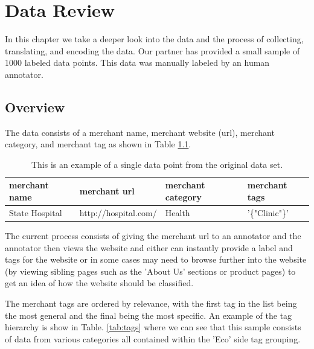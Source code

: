 \chapter{Data Review}

In this chapter we take a deeper look into the data and the process of collecting, translating, and encoding the data. Our partner has provided a small sample of 1000 labeled data points. This data was manually labeled by an human annotator. 

\section{Overview}

The data consists of a merchant name, merchant website (url), merchant category, and merchant tag as shown in Table \ref{tab:data_point}. 

\begin{table}[h]
\begin{tabular}{|l|l|l|l|}
\hline
merchant name            & merchant url            & merchant category & merchant tags           \\ \hline
State Hospital & http://hospital.com/ & Health   & '\{"Clinic"\}' \\ \hline
\end{tabular}
\caption{This is an example of a single data point from the original data set.}
\label{tab:data_point}
\end{table}


The current process consists of giving the merchant url to an annotator and the annotator then views the website and either can instantly  provide a label and tags for the website or in some cases may need to browse further into the website (by viewing sibling pages such as the 'About Us' sections or product pages) to get an idea of how the website should be classified. 

The merchant tags are ordered by relevance, with the first tag in the list being the most general and the final being the most specific. An example of the tag hierarchy is show in Table. \ref{tab:tags} where we can see that this sample consists of data from various categories all contained within the 'Eco' side tag grouping.


